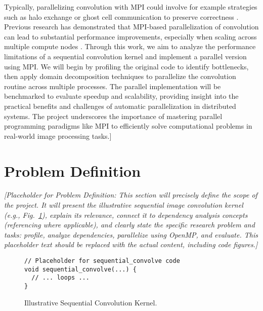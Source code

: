 \documentclass[conference, 10pt]{IEEEtran}
\begin{document}
{{Typically, parallelizing convolution with MPI could involve for example strategies such as halo exchange or ghost cell communication to preserve correctness \cite{toth2016convolution}. 
Previous research has demonstrated that MPI-based parallelization of convolution can lead to substantial performance improvements, especially when scaling across multiple compute nodes \cite{farber2011openmp}.
Through this work, we aim to analyze the performance limitations of a sequential convolution kernel and implement a parallel version using MPI. We will begin by profiling the original code to identify bottlenecks, 
then apply domain decomposition techniques to parallelize the convolution routine across multiple processes. The parallel implementation will be benchmarked to evaluate speedup and scalability, 
providing insight into the practical benefits and challenges of automatic parallelization in distributed systems.
The project underscores the importance of mastering parallel programming paradigms like MPI to efficiently solve computational problems in real-world image processing tasks.]
}}

\section{Problem Definition}
\textit{{\color{blue} %
[Placeholder for Problem Definition: This section will precisely define the scope of the project. It will present the illustrative sequential image convolution kernel (e.g., Fig.~\ref{fig:seq_code}), explain its relevance, connect it to dependency analysis concepts (referencing \cite{idkfactchecking2025} where applicable), and clearly state the specific research problem and tasks: profile, analyze dependencies, parallelize using OpenMP, and evaluate. This placeholder text should be replaced with the actual content, including code figures.]
}}

\begin{figure}[htbp]
\begin{verbatim}
// Placeholder for sequential_convolve code
void sequential_convolve(...) {
  // ... loops ...
}
\end{verbatim}
\caption{Illustrative Sequential Convolution Kernel.}
\label{fig:seq_code}
\end{figure}


\end{document}
